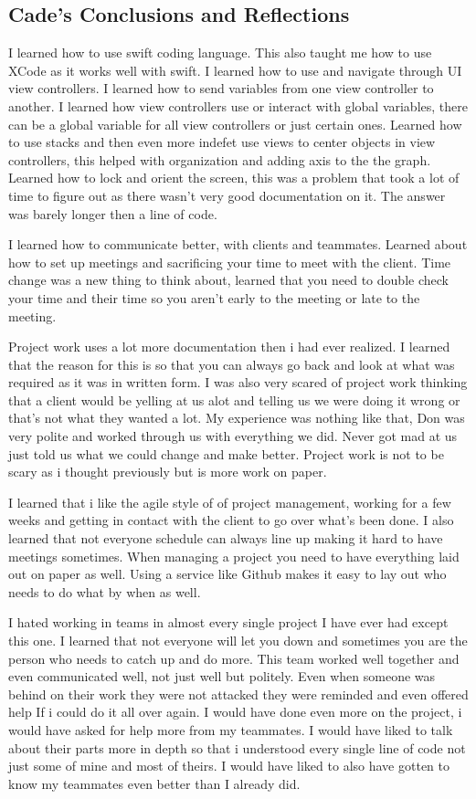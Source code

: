 \documentclass[onecolumn, draftclsnofoot,10pt, compsoc]{IEEEtran}
\begin{document}
\subsection{Cade's Conclusions and Reflections}
I learned how to use swift coding language. This also taught me how to use XCode as it works well with swift. I learned how to use and navigate through UI view controllers. I learned how to send variables from one view controller to another. I learned how view controllers use or interact with global variables, there can be a global variable for all view controllers or just certain ones. Learned how to use stacks and then even more indefet use views to center objects in view controllers, this helped with organization and adding axis to the the graph. Learned how to lock and orient the screen, this was a problem that took a lot of time to figure out as there wasn't very good documentation on it. The answer was barely longer then a line of code.

I learned how to communicate better, with clients and teammates. Learned about how to set up meetings and sacrificing your time to meet with the client. Time change was a new thing to think about, learned that you need to double check your time and their time so you aren't early to the meeting or late to the meeting.

    Project work uses a lot more documentation then i had ever realized. I learned that the reason for this is so that you can always go back and look at what was required as it was in written form. I was also very scared of project work thinking that a client would be yelling at us alot and telling us we were doing it wrong or that's not what they wanted a lot. My experience was nothing like that, Don was very polite and worked through us with everything we did. Never got mad at us just told us what we could change and make better. Project work is not to be scary as i thought previously but is more work on paper.

    I learned that i like the agile style of of project management, working for a few weeks and getting in contact with the client to go over what's been done. I also learned that not everyone schedule can always line up making it hard to have meetings sometimes. When managing a project you need to have everything laid out on paper as well. Using a service like Github makes it easy to lay out who needs to do what by when as well.

    I hated working in teams in almost every single project I have ever had except this one. I learned that not everyone will let you down and sometimes you are the person who needs to catch up and do more. This team worked well together and even communicated well, not just well but politely. Even when someone was behind on their work they were not attacked they were reminded and even offered help
    If i could do it all over again. I would have done even more on the project, i would have asked for help more from my teammates. I would have liked to talk about their parts more in depth so that i understood every single line of code not just some of mine and most of theirs. I would have liked to also have gotten to know my teammates even better than I already did.
\end{document}
